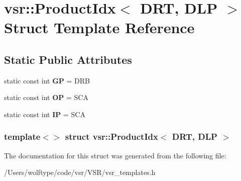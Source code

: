 \hypertarget{structvsr_1_1_product_idx_3_01_d_r_t_00_01_d_l_p_01_4}{\section{vsr\-:\-:Product\-Idx$<$ D\-R\-T, D\-L\-P $>$ Struct Template Reference}
\label{structvsr_1_1_product_idx_3_01_d_r_t_00_01_d_l_p_01_4}
}
\subsection*{Static Public Attributes}
\begin{DoxyCompactItemize}
\item 
\hypertarget{structvsr_1_1_product_idx_3_01_d_r_t_00_01_d_l_p_01_4_a5c0c9b050f62189d98c874ce3d0e5c36}{static const int {\bfseries G\-P} = D\-R\-B}\label{structvsr_1_1_product_idx_3_01_d_r_t_00_01_d_l_p_01_4_a5c0c9b050f62189d98c874ce3d0e5c36}

\item 
\hypertarget{structvsr_1_1_product_idx_3_01_d_r_t_00_01_d_l_p_01_4_afd08259d7802a10b90685c5ea7758038}{static const int {\bfseries O\-P} = S\-C\-A}\label{structvsr_1_1_product_idx_3_01_d_r_t_00_01_d_l_p_01_4_afd08259d7802a10b90685c5ea7758038}

\item 
\hypertarget{structvsr_1_1_product_idx_3_01_d_r_t_00_01_d_l_p_01_4_aecfa8bcb71220aff1bbbc94ad53cdcf8}{static const int {\bfseries I\-P} = S\-C\-A}\label{structvsr_1_1_product_idx_3_01_d_r_t_00_01_d_l_p_01_4_aecfa8bcb71220aff1bbbc94ad53cdcf8}

\end{DoxyCompactItemize}
\subsubsection*{template$<$$>$ struct vsr\-::\-Product\-Idx$<$ D\-R\-T, D\-L\-P $>$}



The documentation for this struct was generated from the following file\-:\begin{DoxyCompactItemize}
\item 
/\-Users/wolftype/code/vsr/\-V\-S\-R/vsr\-\_\-templates.\-h\end{DoxyCompactItemize}
